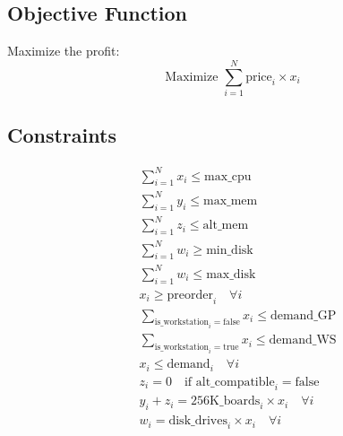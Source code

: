 \documentclass{article}
\begin{document}
\subsection*{Objective Function}
Maximize the profit:
\[
\text{Maximize } \sum_{i=1}^{N} \text{price}_i \times x_i
\]

\subsection*{Constraints}
\begin{align}
    & \sum_{i=1}^{N} x_i \leq \text{max\_cpu} \\
    & \sum_{i=1}^{N} y_i \leq \text{max\_mem} \\
    & \sum_{i=1}^{N} z_i \leq \text{alt\_mem} \\
    & \sum_{i=1}^{N} w_i \geq \text{min\_disk} \\
    & \sum_{i=1}^{N} w_i \leq \text{max\_disk} \\
    & x_i \geq \text{preorder}_i \quad \forall i \\
    & \sum_{\text{is\_workstation}_i = \text{false}} x_i \leq \text{demand\_GP} \\
    & \sum_{\text{is\_workstation}_i = \text{true}} x_i \leq \text{demand\_WS} \\
    & x_i \leq \text{demand}_i \quad \forall i \\
    & z_i = 0 \quad \text{if } \text{alt\_compatible}_i = \text{false} \\
    & y_i + z_i = \text{256K\_boards}_i \times x_i \quad \forall i \\
    & w_i = \text{disk\_drives}_i \times x_i \quad \forall i
\end{align}
\end{document}
